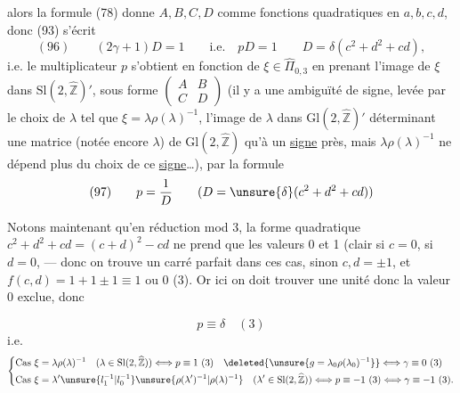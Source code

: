 alors la formule (78) donne $A,B,C,D$ comme
fonctions quadratiques en $a,b,c,d$, 
donc (93) s'écrit
\[
(96)\qquad\boxed{(2\gamma+1)D=1\qquad\text{i.e.}\quad pD=1}
\qquad D=\delta(c^2+d^2+cd),
\]
i.e. le multiplicateur $p$ s'obtient en fonction
de $\xi\in\widehat\Pi_{0,3}$ en prenant l'image
de $\xi$ dans $\mathrm{Sl}(2,\widehat{\mathbb Z})'$, sous forme $\begin{pmatrix}A&B\\C&D\end{pmatrix}$
(il y a une ambiguïté de signe, levée par le
choix de $\lambda$ tel que $\xi=\lambda\rho(\lambda)^{-1}$, l'image
de $\lambda$ dans $\mathrm{Gl}(2,\widehat{\mathbb Z})'$  déterminant une
matrice (notée encore $\lambda$) de $\mathrm{Gl}(2,\widehat{\mathbb Z})$ qu'à un
\uline{signe} près, mais $\lambda\rho(\lambda)^{-1}$ ne dépend plus du
choix de ce \uline{signe}\ldots), par la formule
\[
(97)\qquad p=\frac1D\qquad (D=\unsure{\delta}(c^2+d^2+cd))
\]

Notons maintenant qu'en réduction mod 3,
la forme quadratique $c^2+d^2+cd=(c+d)^2-cd$
ne prend que les valeurs 0 et 1 (clair si $c=0$,
si $d=0$, 
--- donc on
trouve un carré parfait dans ces  cas, sinon
$c,d=\pm1$, et $f(c,d)=1+1\pm1\equiv1$ ou $0$  (3). Or ici
on doit trouver une unité donc la valeur 0 exclue,
donc



\[
p\equiv\delta\quad(3)
\]
i.e.
\[
\left\{\begin{aligned}
\text{Cas }\xi&=\lambda\rho(\lambda)^{-1}\quad(\lambda\in\mathrm{Sl}(2,\widehat{\mathbb Z}))
\Longleftrightarrow p\equiv1\ (3)\quad\deleted{\unsure{g=\lambda_0\rho(\lambda_0)^{-1}}}\Longleftrightarrow\gamma\equiv0\ (3)\\
\text{Cas }\xi&=\lambda'\unsure{l_1^{-1}|l_0^{-1}}\unsure{\rho(\lambda')^{-1}|\rho(\lambda)^{-1}}\quad(\lambda'\in\mathrm{Sl}(2,\widehat{\mathbb Z}))
\Longleftrightarrow p\equiv-1\ (3)\Longleftrightarrow\gamma\equiv-1\ (3).
\end{aligned}\right.
\]

